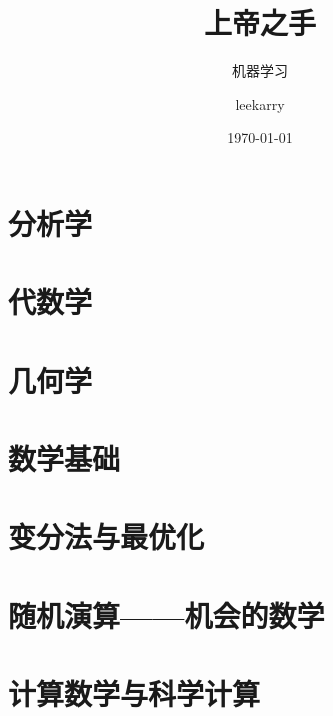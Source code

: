 \documentclass[cn,fancy,blue,11pt]{elegantbook}
\title{上帝之手}
\subtitle{机器学习}
\author{leekarry}
\institute{果壳}
\date{\today}
\begin{document}
\maketitle
\tableofcontents


\mainmatter
\hypersetup{pageanchor=true}

\part{分析学}

\part{代数学}

\part{几何学}

\part{数学基础}

\part{变分法与最优化}

\part{随机演算——机会的数学}

\part{计算数学与科学计算}

\end{document}
